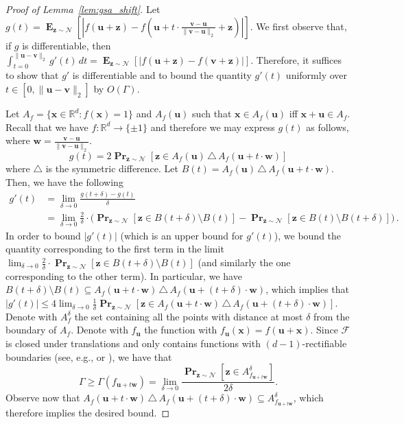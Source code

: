\documentclass[10pt,a4paper]{article}
\renewcommand\vec[1]{\mathbf{#1}}
\DeclareMathOperator*{\pr}{\mathbf{Pr}}
\DeclareMathOperator*{\E}{\mathbf{E}}
\newcommand{\R}{\mathbb{R}}
\newcommand{\1}{\Ind}
\newcommand{\x}{\vec x}
\newcommand{\vv}{\vec v}
\newcommand{\vu}{\vec u}
\newcommand{\vw}{\vec w}
\newcommand{\z}{\vec z}
\newcommand{\F}{\mathcal{F}}
\newcommand{\Gauss}{\mathcal{N}}
\begin{document}
\begin{proof}[Proof of Lemma~\ref{lem:gsa_shift}]
\label{proof:gsa_shift}
    Let $g(t) = \E_{\z\sim\Gauss}[|f(\vu+\z)-f(\vu+t\cdot\frac{\vv-\vu}{\|\vv-\vu\|_2}+\z)|]$. We first observe that, if $g$ is differentiable, then $\int_{t=0}^{\|\vu-\vv\|_2} g'(t) \, dt = \E_{\z\sim\Gauss}[|f(\vu+\z)-f(\vv+\z)|]$. Therefore, it suffices to show that $g'$ is differentiable and to bound the quantity $g'(t)$ uniformly over $t\in[0,\|\vu-\vv\|_2]$ by $O(\Gamma)$. 

    Let $A_f = \{\x\in\R^d: f(\x)=1\}$ and $A_f(\vu)$ such that $\x\in A_f(\vu)$ iff $\x+\vu\in A_f$. Recall that we have $f:\R^d\to\{\pm 1\}$ and therefore we may express $g(t)$ as follows, where $\vec w = \frac{\vv-\vu}{\|\vv-\vu\|_2}$.
    \[
        g(t) = 2\pr_{\z\sim\Gauss}[\z\in A_f(\vu)\,\triangle\, A_f(\vu+t\cdot \vec w)] 
    \] where $\triangle$ is the symmetric difference.
    Let $B(t) = A_f(\vu)\,\triangle\, A_f(\vu+t\cdot \vec w)$. Then, we have the following
    \begin{align*}
        g'(t) &= \lim_{\delta\to0} \frac{g(t+\delta)-g(t)}{\delta}\\
        &=\lim_{\delta\to0} \frac{2}{\delta}\cdot \Bigr( \pr_{\z\sim\Gauss}[\z\in B(t+\delta)\setminus B(t)] - \pr_{\z\sim\Gauss}[\z\in B(t)\setminus B(t+\delta)] \Bigr)\,.
    \end{align*}
    In order to bound $|g'(t)|$ (which is an upper bound for $g'(t)$), we bound the quantity corresponding to the first term in the limit $\lim_{\delta\to0} \frac{2}{\delta}\cdot \pr_{\z\sim\Gauss}[\z\in B(t+\delta)\setminus B(t)]$ (and similarly the one corresponding to the other term). In particular, we have $B(t+\delta)\setminus B(t)\subseteq A_f(\vu+t\cdot \vec w)\,\triangle\, A_f(\vu+(t+\delta)\cdot \vec w)$, which implies that $|g'(t)| \le 4\lim_{\delta\to0} \frac{1}{\delta}\pr_{\z\sim \Gauss}[\z\in A_f(\vu+t\cdot \vec w)\,\triangle\, A_f(\vu+(t+\delta)\cdot \vec w)]$. Denote with $A_f^\delta$ the set containing all the points with distance at most $\delta$ from the boundary of $A_f$. Denote with $f_{\vu}$ the function with $f_{\vu}(\x) = f(\vu+\x)$. Since $\F$ is closed under translations and only contains functions with $(d-1)$-rectifiable boundaries (see, e.g., \cite{federer1969geometric} or \cite[Proposition A.3]{Kane11}), we have that 
    \[
        \Gamma\ge \Gamma(f_{\vu+t\vw}) = \lim_{\delta\to 0}\frac{\pr_{\z\sim\Gauss}[\z\in A_{f_{\vu+t\vw}}^\delta]}{2\delta}.
    \]
    Observe now that $A_f(\vu+t\cdot \vec w)\,\triangle\, A_f(\vu+(t+\delta)\cdot \vec w) \subseteq A_{f_{\vu+t\vw}}^\delta$, which therefore implies the desired bound.
\end{proof}
\end{document}
